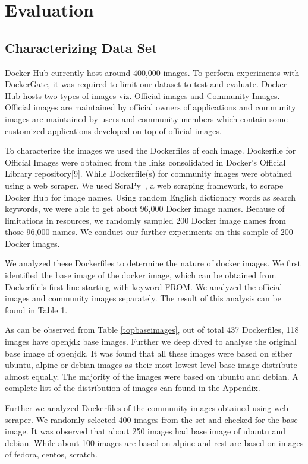 \section{Evaluation}
\label{sec:eval}

\subsection{Characterizing Data Set}

Docker Hub currently host around 400,000 images. To perform experiments with DockerGate, it was required to limit our dataset to test and evaluate. Docker Hub hosts two types of images viz. Official images and Community Images. Official images are maintained by official owners of applications and community images are maintained by users and community members which contain some customized applications developed on top of official images.

To characterize the images we used the Dockerfiles of each image. Dockerfile for Official Images were obtained from the links consolidated in Docker’s Official Library repository[9]. While Dockerfile(s) for community images were obtained using a web scraper. We used ScraPy~\cite{scrapy}, a web scraping framework, to scrape Docker Hub for image names. Using random English dictionary words as search keywords, we were able to get about 96,000 Docker image names. Because of limitations in resources, we randomly sampled 200 Docker image names from those 96,000 names. We conduct our further experiments on this sample of 200 Docker images.

We analyzed these Dockerfiles to determine the nature of docker images. We first identified the base image of the docker image, which can be obtained from Dockerfile’s first line starting with keyword FROM. We analyzed the official images and community images separately. The result of this analysis can be found in Table 1.

As can be observed from Table \ref{topbaseimages}, out of total 437 Dockerfiles, 118 images have openjdk base images. Further we deep dived to analyse the original base image of openjdk. It was found that all these images were based on either ubuntu, alpine or debian images as their most lowest level base image distribute almost equally.
The majority of the images were based on ubuntu and debian. A complete list of the distribution of images can found in the Appendix.

Further we analyzed Dockerfiles of the community images obtained using web scraper. We randomly selected 400 images from the set and checked for the base image. It was observed that about 250 images had base image of ubuntu and debian. While  about 100 images are based on alpine and rest are based on images of fedora, centos, scratch.

